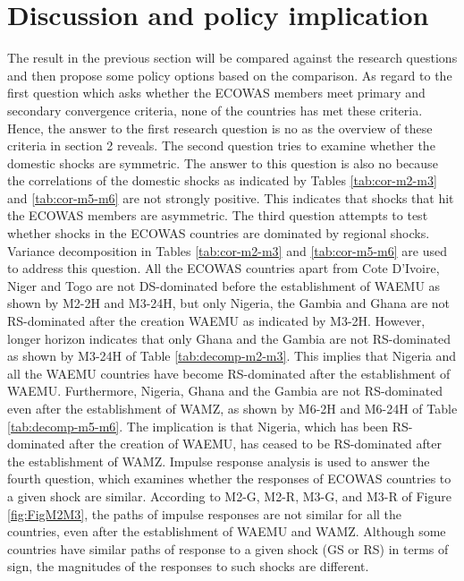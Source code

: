 \documentclass[]{article}
\begin{document}
\hypertarget{discussion-and-policy-implication}{%
\section{Discussion and policy implication}\label{discussion-and-policy-implication}}

The result in the previous section will be compared against the research questions and then propose some policy options based on the comparison. As regard to the first question which asks whether the ECOWAS members meet primary and secondary convergence criteria, none of the countries has met these criteria. Hence, the answer to the first research question is no as the overview of these criteria in section 2 reveals. The second question tries to examine whether the domestic shocks are symmetric. The answer to this question is also no because the correlations of the domestic shocks as indicated by Tables \ref{tab:cor-m2-m3} and \ref{tab:cor-m5-m6} are not strongly positive. This indicates that shocks that hit the ECOWAS members are asymmetric. The third question attempts to test whether shocks in the ECOWAS countries are dominated by regional shocks. Variance decomposition in Tables \ref{tab:cor-m2-m3} and \ref{tab:cor-m5-m6} are used to address this question. All the ECOWAS countries apart from Cote D'Ivoire, Niger and Togo are not DS-dominated before the establishment of WAEMU as shown by M2-2H and M3-24H, but only Nigeria, the Gambia and Ghana are not RS-dominated after the creation WAEMU as indicated by M3-2H. However, longer horizon indicates that only Ghana and the Gambia are not RS-dominated as shown by M3-24H of Table \ref{tab:decomp-m2-m3}. This implies that Nigeria and all the WAEMU countries have become RS-dominated after the establishment of WAEMU. Furthermore, Nigeria, Ghana and the Gambia are not RS-dominated even after the establishment of WAMZ, as shown by M6-2H and M6-24H of Table \ref{tab:decomp-m5-m6}. The implication is that Nigeria, which has been RS-dominated after the creation of WAEMU, has ceased to be RS-dominated after the establishment of WAMZ. Impulse response analysis is used to answer the fourth question, which examines whether the responses of ECOWAS countries to a given shock are similar. According to M2-G, M2-R, M3-G, and M3-R of Figure \ref{fig:FigM2M3}, the paths of impulse responses are not similar for all the countries, even after the establishment of WAEMU and WAMZ. Although some countries have similar paths of response to a given shock (GS or RS) in terms of sign, the magnitudes of the responses to such shocks are different.
\end{document}
